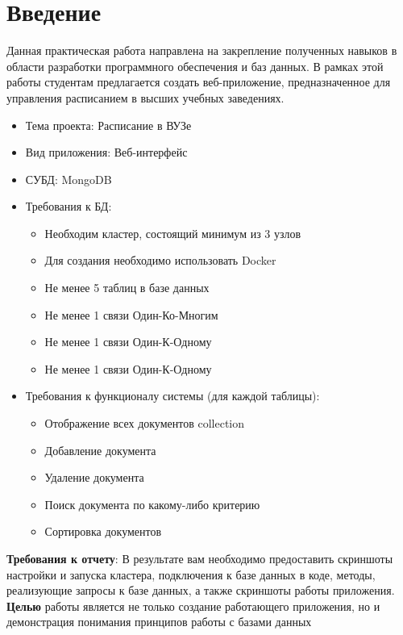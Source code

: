\section*{\LARGE Введение}

Данная практическая работа направлена на закрепление полученных навыков
в области разработки программного обеспечения и баз данных.
В рамках этой работы студентам предлагается создать веб-приложение,
предназначенное для управления расписанием в высших учебных заведениях.

\begin{itemize}
    \item Тема проекта: Расписание в ВУЗе
    \item Вид приложения: Веб-интерфейс
    \item СУБД: MongoDB
    \item Требования к БД:
    \begin{itemize}
        \item Необходим кластер, состоящий минимум из 3 узлов
        \item Для создания необходимо использовать Docker
        \item Не менее 5 таблиц в базе данных
        \item Не менее 1 связи Один-Ко-Многим
        \item Не менее 1 связи Один-К-Одному
        \item Не менее 1 связи Один-К-Одному
    \end{itemize}
    \item Требования к функционалу системы (для каждой таблицы):
    \begin{itemize}
        \item Отображение всех документов collection
        \item Добавление документа
        \item Удаление документа
        \item Поиск документа по какому-либо критерию
        \item Сортировка документов
    \end{itemize}
\end{itemize}

\textbf{Требования к отчету}:
В результате вам необходимо предоставить скриншоты настройки и
запуска кластера, подключения к базе данных в коде, методы, реализующие
запросы к базе данных, а также скриншоты работы приложения.
\textbf{Целью} работы является не только создание работающего приложения,
но и демонстрация понимания принципов работы
с базами данных
\clearpage
